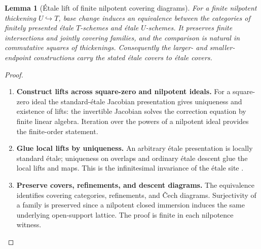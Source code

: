 \documentclass[11pt,a4paper]{article}
\numberwithin{algorithm}{section}
\numberwithin{equation}{section}
\newtheorem{lemma}[lemma]{Lemma}
\theoremstyle{definition}
\theoremstyle{remark}
\theoremstyle{plain}
\theoremstyle{definition}
\theoremstyle{plain}
\begin{document}
\begin{lemma}[\'Etale lift of finite nilpotent covering diagrams]
\label{lem:etale-nilpotent-lift}
For a finite nilpotent thickening $U\hookrightarrow T$, base
change induces an equivalence between the categories of
finitely presented \'etale $T$-schemes and \'etale $U$-schemes.
It preserves finite intersections and jointly covering families,
and the comparison is natural in commutative squares of thickenings.
Consequently the larger- and smaller-endpoint constructions
carry the stated \'etale covers to \'etale covers.
\end{lemma}
\begin{proof}\leavevmode
\begin{enumerate}[leftmargin=*,align=left]
\item \textbf{Construct lifts across square-zero and nilpotent ideals.}
For a square-zero ideal the standard-\'etale Jacobian
presentation gives uniqueness and existence of lifts: the
invertible Jacobian solves the correction equation by finite
linear algebra.  Iteration over the powers of a nilpotent ideal
provides the finite-order statement.

\item \textbf{Glue local lifts by uniqueness.}
An arbitrary \'etale
presentation is locally standard \'etale; uniqueness on overlaps
and ordinary \'etale descent glue the local lifts and maps.
This is the infinitesimal invariance of the \'etale site
\citep[Theorems 41.15.2 and 41.16.1; Section 59.45]{StacksEtale}.

\item \textbf{Preserve covers, refinements, and descent diagrams.}
The equivalence identifies covering categories, refinements, and \v{C}ech diagrams.  Surjectivity of a family is preserved since
a nilpotent closed immersion induces the same underlying
open-support lattice.  The proof is finite in each nilpotence witness.
\end{enumerate}
\end{proof}
\end{document}
